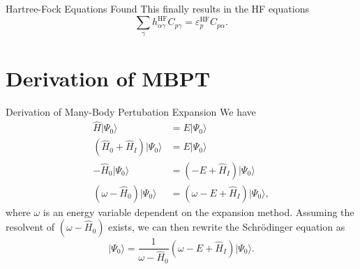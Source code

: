 \documentclass[UKenglish,aspectratio=169]{beamer}
\begin{document}
\begin{frame}{Hartree-Fock Equations Found}
    This finally results in the HF equations
    \begin{equation}
        \sum_{\gamma} h_{\alpha\gamma}^\mathrm{HF} C_{p \gamma} =
        \varepsilon_p^\mathrm{HF} C_{p \alpha}.
    \end{equation}
\end{frame}

\section{Derivation of MBPT}
\begin{frame}{Derivation of Many-Body Pertubation Expansion}
    We have
    \begin{align}
        \hat{H} \lvert \Psi_0 \rangle &= E \lvert \Psi_0 \rangle \\
        \left( \hat{H}_0 + \hat{H}_I \right) \lvert \Psi_0 \rangle &= E \lvert \Psi_0 \rangle \\
        -\hat{H}_0 \lvert \Psi_0 \rangle &= \left( - E + \hat{H}_I \right) \lvert \Psi_0 \rangle \\
        \left( \omega - \hat{H}_0 \right) \lvert \Psi_0 \rangle &= \left(\omega - E + \hat{H}_I \right) \lvert \Psi_0 \rangle,
    \end{align}
    where $\omega$ is an energy variable dependent on the expansion method.
    Assuming the resolvent of $\left( \omega - \hat{H}_0 \right)$ exists, we can then rewrite the Schrödinger equation as
    \begin{equation}
        \lvert \Psi_0 \rangle = \frac{1}{\omega - \hat{H}_0} \left( \omega - E + \hat{H}_I \right) \lvert \Psi_0 \rangle.
    \end{equation}
\end{frame}
\end{document}
